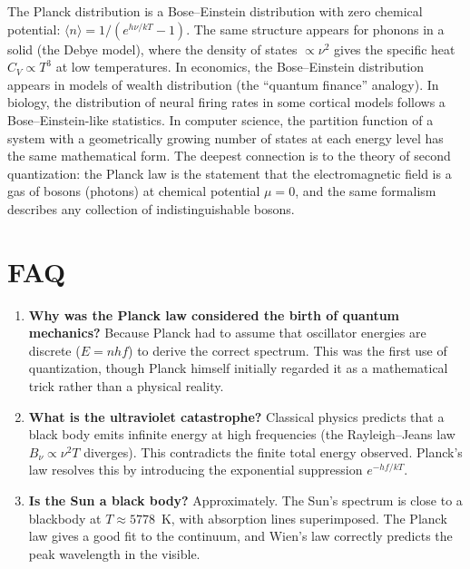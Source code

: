 The Planck distribution is a Bose--Einstein distribution with zero chemical potential: $\langle n\rangle = 1/(e^{h\nu/kT} - 1)$. The same structure appears for phonons in a solid (the Debye model), where the density of states $\propto \nu^{2}$ gives the specific heat $C_{V} \propto T^{3}$ at low temperatures. In economics, the Bose--Einstein distribution appears in models of wealth distribution (the ``quantum finance'' analogy). In biology, the distribution of neural firing rates in some cortical models follows a Bose--Einstein-like statistics. In computer science, the partition function of a system with a geometrically growing number of states at each energy level has the same mathematical form. The deepest connection is to the theory of second quantization: the Planck law is the statement that the electromagnetic field is a gas of bosons (photons) at chemical potential $\mu = 0$, and the same formalism describes any collection of indistinguishable bosons.

\section*{FAQ}

\begin{enumerate}
\item \textbf{Why was the Planck law considered the birth of quantum mechanics?}
Because Planck had to assume that oscillator energies are discrete ($E = nhf$) to derive the correct spectrum. This was the first use of quantization, though Planck himself initially regarded it as a mathematical trick rather than a physical reality.

\item \textbf{What is the ultraviolet catastrophe?}
Classical physics predicts that a black body emits infinite energy at high frequencies (the Rayleigh--Jeans law $B_{\nu} \propto \nu^{2}T$ diverges). This contradicts the finite total energy observed. Planck's law resolves this by introducing the exponential suppression $e^{-hf/kT}$.

\item \textbf{Is the Sun a black body?}
Approximately. The Sun's spectrum is close to a blackbody at $T \approx 5778$~K, with absorption lines superimposed. The Planck law gives a good fit to the continuum, and Wien's law correctly predicts the peak wavelength in the visible.
\end{enumerate}
